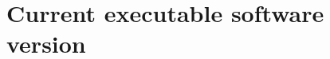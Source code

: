 \documentclass[preprint,12pt, a4paper]{elsarticle}
\begin{document}
\cite{banerjee2025flotilla}









\section*{Current executable software version}
\label{}
\end{document}
